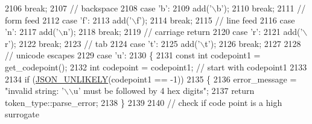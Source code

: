 \begin{DoxyCode}
2106                             \textcolor{keywordflow}{break};
2107                         \textcolor{comment}{// backspace}
2108                         \textcolor{keywordflow}{case} \textcolor{charliteral}{'b'}:
2109                             add(\textcolor{charliteral}{'\(\backslash\)b'});
2110                             \textcolor{keywordflow}{break};
2111                         \textcolor{comment}{// form feed}
2112                         \textcolor{keywordflow}{case} \textcolor{charliteral}{'f'}:
2113                             add(\textcolor{charliteral}{'\(\backslash\)f'});
2114                             \textcolor{keywordflow}{break};
2115                         \textcolor{comment}{// line feed}
2116                         \textcolor{keywordflow}{case} \textcolor{charliteral}{'n'}:
2117                             add(\textcolor{charliteral}{'\(\backslash\)n'});
2118                             \textcolor{keywordflow}{break};
2119                         \textcolor{comment}{// carriage return}
2120                         \textcolor{keywordflow}{case} \textcolor{charliteral}{'r'}:
2121                             add(\textcolor{charliteral}{'\(\backslash\)r'});
2122                             \textcolor{keywordflow}{break};
2123                         \textcolor{comment}{// tab}
2124                         \textcolor{keywordflow}{case} \textcolor{charliteral}{'t'}:
2125                             add(\textcolor{charliteral}{'\(\backslash\)t'});
2126                             \textcolor{keywordflow}{break};
2127 
2128                         \textcolor{comment}{// unicode escapes}
2129                         \textcolor{keywordflow}{case} \textcolor{charliteral}{'u'}:
2130                         \{
2131                             \textcolor{keyword}{const} \textcolor{keywordtype}{int} codepoint1 = get\_codepoint();
2132                             \textcolor{keywordtype}{int} codepoint = codepoint1; \textcolor{comment}{// start with codepoint1}
2133 
2134                             \textcolor{keywordflow}{if} (\hyperlink{json_8hpp_ab77582407c64944e7db1ea95ab520253}{JSON\_UNLIKELY}(codepoint1 == -1))
2135                             \{
2136                                 error\_message = \textcolor{stringliteral}{"invalid string: '\(\backslash\)\(\backslash\)u' must be followed by 4 hex digits"};
2137                                 \textcolor{keywordflow}{return} token\_type::parse\_error;
2138                             \}
2139 
2140                             \textcolor{comment}{// check if code point is a high surrogate}

\end{DoxyCode}
